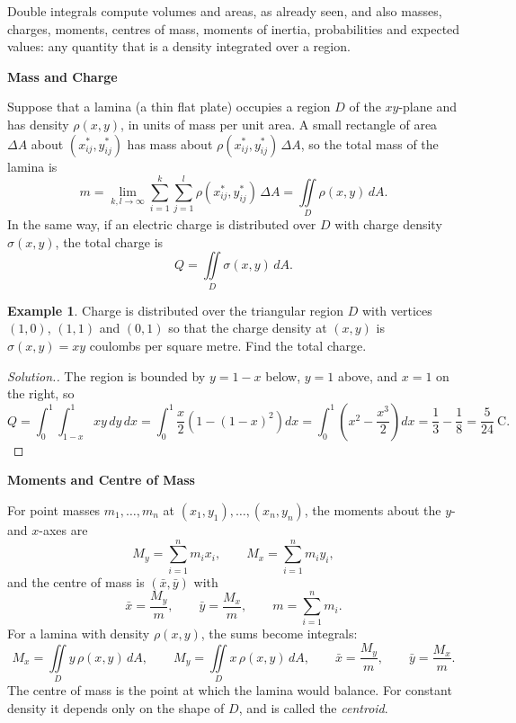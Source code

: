 \documentclass[11pt,a4paper]{article}
\theoremstyle{definition}
\newtheorem{exa}[thm]{Example}
\newenvironment{solution}
  {\renewcommand{\qedsymbol}{}\begin{proof}[\textit{Solution}.]}
  {\end{proof}}
\newcommand{\subhead}[1]{%
  \par\medskip\noindent\textbf{#1}\par\nobreak\smallskip}
\begin{document}
Double integrals compute volumes and areas, as already seen, and also masses,
charges, moments, centres of mass, moments of inertia, probabilities and
expected values: any quantity that is a density integrated over a region.

\subhead{Mass and Charge}

Suppose that a lamina (a thin flat plate) occupies a region $D$ of the
$xy$-plane and has density $\rho (x,y)$, in units of mass per unit area. A small
rectangle of area $\Delta A$ about $(x^*_{ij},y^*_{ij})$ has mass about
$\rho(x^*_{ij},y^*_{ij})\,\Delta A$, so the total mass of the lamina is
\[m = \lim_{k,l\to \infty} \sum^k_{i=1}\sum^l_{j=1} \rho (x_{ij}^*,y^*_{ij})\,
\Delta A = \iint\limits_D \rho (x,y)\,dA .\]
In the same way, if an electric charge is distributed over $D$ with charge
density $\sigma (x,y)$, the total charge is
\[Q = \iint\limits_D \sigma (x,y)\,dA .\]

\begin{exa}
\label{ex:charge}
Charge is distributed over the triangular region $D$ with vertices $(1,0)$,
$(1,1)$ and $(0,1)$ so that the charge density at $(x,y)$ is
$\sigma(x,y) = xy$ coulombs per square metre. Find the total charge.

\begin{figure}[H]
\centering
{}
\end{figure}
\end{exa}

\begin{solution}
The region is bounded by $y = 1 - x$ below, $y = 1$ above, and $x = 1$ on the
right, so
\[Q = \int^1_0\int^1_{1-x} xy\,dy\,dx = \int_0^1 \frac{x}{2}\left(1 -
(1-x)^2\right)dx = \int_0^1\left(x^2 - \frac{x^3}{2}\right)dx = \frac13 -
\frac18 = \frac{5}{24}\ \text{C}.\]
\end{solution}

\subhead{Moments and Centre of Mass}

For point masses $m_1,\dots, m_n$ at $(x_1,y_1),\dots, (x_n,y_n)$, the moments
about the $y$- and $x$-axes are
\[M_y = \sum_{i=1}^n m_ix_i ,\qquad M_x = \sum_{i=1}^n m_iy_i ,\]
and the centre of mass is $(\bar x,\bar y)$ with
\[\bar x = \frac{M_y}{m} , \qquad \bar y = \frac{M_x}{m} ,\qquad m =
\sum^n_{i=1} m_i .\]
For a lamina with density $\rho (x,y)$, the sums become integrals:
\[M_x = \iint\limits_D y \, \rho(x,y)\,dA ,\qquad M_y = \iint\limits_D x \,
\rho(x,y)\,dA ,\qquad \bar x = \frac{M_y}{m},\qquad \bar y = \frac{M_x}{m} .\]
The centre of mass is the point at which the lamina would balance. For constant
density it depends only on the shape of $D$, and is called the
\emph{centroid}.
\end{document}
